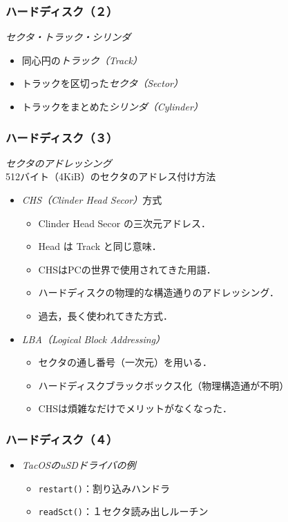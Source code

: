 \documentclass{beamer}                   %
\begin{document}
\begin{frame}
  \frametitle{ハードディスク（２）}
  \emph{セクタ・トラック・シリンダ}
  \begin{itemize}
  \item 同心円の\emph{トラック（Track）}
  \item トラックを区切った\emph{セクタ（Sector）}
  \item トラックをまとめた\emph{シリンダ（Cylinder）}
  \end{itemize}
\end{frame}

\begin{frame}
  \frametitle{ハードディスク（３）}
  \emph{セクタのアドレッシング}\\
  512バイト（4KiB）のセクタのアドレス付け方法
  \begin{itemize}
  \item \emph{CHS（Clinder Head Secor）}方式
    \begin{itemize}
    \item Clinder Head Secor の三次元アドレス．
    \item Head は Track と同じ意味．
    \item CHSはPCの世界で使用されてきた用語．
    \item ハードディスクの物理的な構造通りのアドレッシング．
    \item 過去，長く使われてきた方式．
  \end{itemize}
  \item \emph{LBA（Logical Block Addressing）}
    \begin{itemize}
    \item セクタの通し番号（一次元）を用いる．
    \item ハードディスクブラックボックス化（物理構造通が不明）
    \item CHSは煩雑なだけでメリットがなくなった．
    \end{itemize}
  \end{itemize}
\end{frame}

\begin{frame}
  \frametitle{ハードディスク（４）}
  \begin{itemize}
  \item \emph{TacOSのuSDドライバの例}
    \begin{itemize}
    \item \texttt{restart()}：割り込みハンドラ
    \item \texttt{readSct()}：１セクタ読み出しルーチン
    \end{itemize}
  \end{itemize}
\end{frame}
\end{document}
